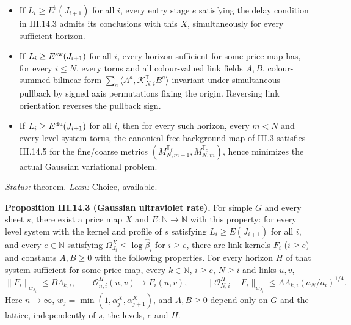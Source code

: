 \documentclass[
  letterpaper,
  11pt]{article}
\providecommand{\tightlist}{%
  \setlength{\itemsep}{0pt}\setlength{\parskip}{0pt}}
\begin{document}
\begin{itemize}
\tightlist
\item
  If \(L_i\ge E^\flat(J_{i+1})\) for all \(i\), every entry stage \(e\)
  satisfying the delay condition in III.14.3 admits its conclusions with
  this \(X\), simultaneously for every sufficient horizon.
\item
  If \(L_i\ge E^{\rm sw}(J_{i+1})\) for all \(i\), every horizon
  sufficient for some price map has, for every \(i\le N\), every torus
  and all colour-valued link fields \(A,B\), colour-summed bilinear form
  \(\sum_a\langle A^a,\mathcal K^{\mathbb T}_{N,i}B^a\rangle\) invariant
  under simultaneous pullback by signed axis permutations fixing the
  origin. Reversing link orientation reverses the pullback sign.
\item
  If \(L_i\ge E^{\rm du}(J_{i+1})\) for all \(i\), then for every such
  horizon, every \(m<N\) and every level-system torus, the canonical
  free background map of III.3 satisfies III.14.5 for the fine/coarse
  metrics \((M^{\mathbb T_f}_{N,m+1},M^{\mathbb T_c}_{N,m})\), hence
  minimizes the actual Gaussian variational problem.
\end{itemize}

\emph{Status:} theorem. \emph{Lean:}
\href{https://github.com/yang-mills-group/OpenAI-YM-20261028/blob/3456e5e75cf8d4cd558955a5c7638fba2d68f464/YM/Integration/NativeComponentRecipe.lean\#L29-L51}{Choice},
\href{https://github.com/yang-mills-group/OpenAI-YM-20261028/blob/3456e5e75cf8d4cd558955a5c7638fba2d68f464/YM/Integration/NativeComponentRecipe.lean\#L54-L59}{available}.

\textbf{Proposition III.14.3 (Gaussian ultraviolet rate).} For simple
\(G\) and every sheet \(s\), there exist a price map \(X\) and
\(E:\mathbb N\to\mathbb N\) with this property: for every level system
with the kernel and profile of \(s\) satisfying \(L_i\ge E(J_{i+1})\)
for all \(i\), and every \(e\in\mathbb N\) satisfying
\(\Omega^X_{J_i}\le\log\hat\beta_i\) for \(i\ge e\), there are link
kernels \(F_i\) (\(i\ge e\)) and constants \(A,B\ge0\) with the
following properties. For every horizon \(H\) of that system sufficient
for some price map, every \(k\in\mathbb N\), \(i\ge e\), \(N\ge i\) and
links \(u,v\), \[\lVert F_i\rVert_{w_{J_i}}\le B\Lambda_{k,i},\qquad
\mathcal O^H_{n,i}(u,v)\longrightarrow F_i(u,v),\qquad
\lVert\mathcal O^H_{N,i}-F_i\rVert_{w_{J_i}}\le A\Lambda_{k,i}(a_N/a_i)^{1/4}.\]
Here \(n\to\infty\), \(w_j=\min(1,\alpha^X_j,\alpha^X_{j+1})\), and
\(A,B\ge0\) depend only on \(G\) and the lattice, independently of
\(s\), the levels, \(e\) and \(H\).
\end{document}

